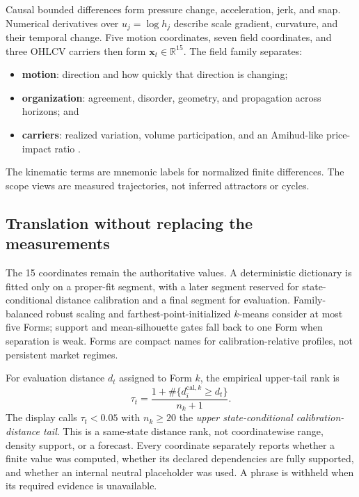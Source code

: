 \documentclass{article}
\newcommand{\R}{\mathbb{R}}
\begin{document}
Causal bounded differences form pressure change, acceleration, jerk, and snap. Numerical derivatives over $u_j=\log h_j$ describe scale gradient, curvature, and their temporal change. Five motion coordinates, seven field coordinates, and three OHLCV carriers then form $\mathbf{x}_t\in\R^{15}$. The field family separates:
\begin{itemize}
    \item \textbf{motion}: direction and how quickly that direction is changing;
    \item \textbf{organization}: agreement, disorder, geometry, and propagation across horizons; and
    \item \textbf{carriers}: realized variation, volume participation, and an Amihud-like price-impact ratio \citep{amihud2002illiquidity}.
\end{itemize}
The kinematic terms are mnemonic labels for normalized finite differences. The scope views are measured trajectories, not inferred attractors or cycles.

\subsection{Translation without replacing the measurements}

The 15 coordinates remain the authoritative values. A deterministic dictionary is fitted only on a proper-fit segment, with a later segment reserved for state-conditional distance calibration and a final segment for evaluation. Family-balanced robust scaling and farthest-point-initialized $k$-means \citep{macqueen1967methods,gonzalez1985clustering} consider at most five Forms; support and mean-silhouette gates \citep{rousseeuw1987silhouettes} fall back to one Form when separation is weak. Forms are compact names for calibration-relative profiles, not persistent market regimes.

For evaluation distance $d_t$ assigned to Form $k$, the empirical upper-tail rank is
\begin{equation}
\tau_t=\frac{1+\#\{d_i^{\mathrm{cal},k}\ge d_t\}}{n_k+1}.
\label{eq:tail}
\end{equation}
The display calls $\tau_t<0.05$ with $n_k\ge20$ the \emph{upper state-conditional calibration-distance tail}. This is a same-state distance rank, not coordinatewise range, density support, or a forecast. Every coordinate separately reports whether a finite value was computed, whether its declared dependencies are fully supported, and whether an internal neutral placeholder was used. A phrase is withheld when its required evidence is unavailable.
\end{document}
